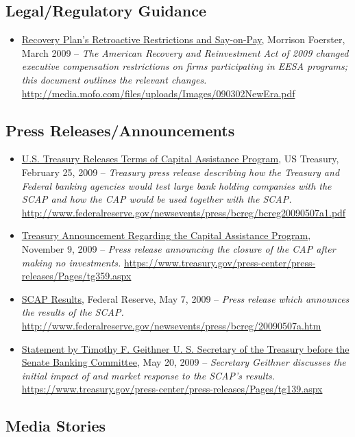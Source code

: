 \documentclass[12pt]{article}
\begin{document}
\subsection{Legal/Regulatory Guidance}

\begin{itemize}
\item
\ul{Recovery Plan's Retroactive Restrictions and Say-on-Pay}, Morrison Foerster, March 2009 -- \emph{The American Recovery and Reinvestment Act of 2009 changed executive compensation restrictions on firms participating in EESA programs; this document outlines the relevant changes.} \url{http://media.mofo.com/files/uploads/Images/090302NewEra.pdf}
\end{itemize}

\subsection{Press Releases/Announcements}

\begin{itemize}
\item
\ul{U.S. Treasury Releases Terms of Capital Assistance Program}, US Treasury, February 25, 2009 -- \emph{Treasury press release describing how the Treasury and Federal banking agencies would test large bank holding companies with the SCAP and how the CAP would be used together with the SCAP.} \url{http://www.federalreserve.gov/newsevents/press/bcreg/bcreg20090507a1.pdf}
\item
\ul{ Treasury Announcement Regarding the Capital Assistance Program}, November 9, 2009 -- \emph{Press release announcing the closure of the CAP after making no investments.} \url{https://www.treasury.gov/press-center/press-releases/Pages/tg359.aspx}
\item
\ul{SCAP
  Results}, Federal Reserve, May 7, 2009 -- \emph{Press release which
  announces the results of the SCAP.} \url{http://www.federalreserve.gov/newsevents/press/bcreg/20090507a.htm}
\item
\ul{Statement
  by Timothy F. Geithner U. S. Secretary of the Treasury before the
  Senate Banking Committee}, May 20, 2009 -- \emph{Secretary Geithner
  discusses the initial impact of and market response to the SCAP's
  results.} \url{https://www.treasury.gov/press-center/press-releases/Pages/tg139.aspx}
\end{itemize}

\subsection{Media Stories}
\end{document}
